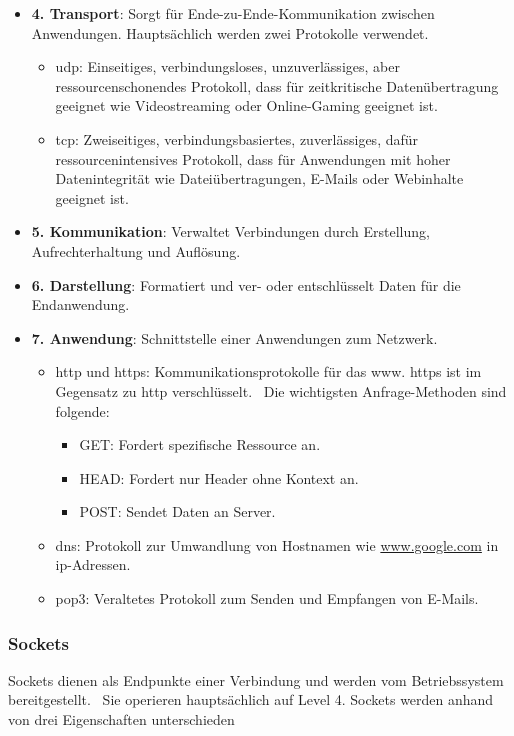 \documentclass[11pt, a4paper]{article}
\begin{document}
\begin{itemize}
\begin{itemize}
	\end{itemize}
	\item \textbf{4. Transport}: Sorgt für Ende-zu-Ende-Kommunikation zwischen Anwendungen. Hauptsächlich werden zwei Protokolle verwendet.
	\begin{itemize}
		\item \gls{udp}: Einseitiges, verbindungsloses, unzuverlässiges, aber ressourcenschonendes Protokoll, dass für zeitkritische Datenübertragung geeignet wie Videostreaming oder Online-Gaming geeignet ist.
		\item \gls{tcp}: Zweiseitiges, verbindungsbasiertes, zuverlässiges, dafür ressourcenintensives Protokoll, dass für Anwendungen mit hoher Datenintegrität wie Dateiübertragungen, E-Mails oder Webinhalte geeignet ist.
	\end{itemize}
	\item \textbf{5. Kommunikation}: Verwaltet Verbindungen durch Erstellung, Aufrechterhaltung und Auflösung.
	\item \textbf{6. Darstellung}: Formatiert und ver- oder entschlüsselt Daten für die Endanwendung.
	\item \textbf{7. Anwendung}: Schnittstelle einer Anwendungen zum Netzwerk.
	\begin{itemize}
		\item \gls{http} und \gls{https}: Kommunikationsprotokolle für das \gls{www}. \gls{https} ist im Gegensatz zu \gls{http} verschlüsselt.~\cite{HTTPWiki6:online, HTTPvers49:online} Die wichtigsten Anfrage-Methoden sind folgende:
		\begin{itemize}
			\item GET: Fordert spezifische Ressource an.
			\item HEAD: Fordert nur Header ohne Kontext an.
			\item POST: Sendet Daten an Server.
		\end{itemize}
		\item \gls{dns}: Protokoll zur Umwandlung von Hostnamen wie \url{www.google.com} in \gls{ip}-Adressen.
		\item \gls{pop3}: Veraltetes Protokoll zum Senden und Empfangen von E-Mails.~\cite{Pop3microsoft:online}
	\end{itemize}
\end{itemize}

\subsubsection{Sockets}
Sockets dienen als Endpunkte einer Verbindung und werden vom Betriebssystem bereitgestellt.~\cite{SocketW33:online} Sie operieren hauptsächlich auf Level 4. Sockets werden anhand von drei Eigenschaften unterschieden
\end{document}
